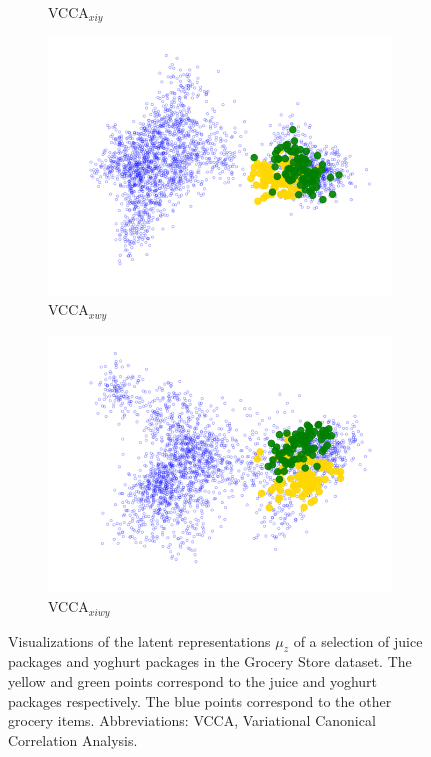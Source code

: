 \begin{figure}[t]
\begin{subfigure}[b]{0.3\textwidth}
         \caption{VCCA$_{x i y}$}
         \label{fig:pca_vcca_xiy_juice_yoghurt}
     \end{subfigure} 
     \begin{subfigure}[b]{0.3\textwidth}
         \centering
         \includegraphics[width=\textwidth]{figures_and_tables/latent_space_visualizations/juice_yoghurt_new/pca_latent_juice_yoghurt_vcca_xwy_seed2.png}
         \caption{VCCA$_{x w y}$}
         \label{fig:pca_vcca_xwy_juice_yoghurt}
     \end{subfigure} 
     \begin{subfigure}[b]{0.3\textwidth}
         \centering
         \includegraphics[width=\textwidth]{figures_and_tables/latent_space_visualizations/juice_yoghurt_new/pca_latent_juice_yoghurt_vcca_xiwy_seed2.png}
         \caption{VCCA$_{x i w y}$}
         \label{fig:pca_vcca_xiwy_juice_yoghurt}
     \end{subfigure} 
    \caption{Visualizations of the latent representations $\mu_{z}$ of a selection of juice packages and yoghurt packages in the Grocery Store dataset. The yellow and green points correspond to the juice and yoghurt packages respectively. The blue points correspond to the other grocery items. Abbreviations: VCCA, Variational Canonical Correlation Analysis.}
    \label{fig:2d_visualizations_pca_juice_yoghurt}
\end{figure}

